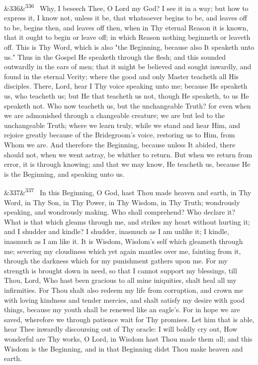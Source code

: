 \documentclass[12pt]{article}
\newcommand{\para}[1][]{\par\noindent\ifx&#1&\else\textsuperscript{\footnotesize #1}~\fi}
\begin{document}
\para[336] Why, I beseech Thee, O Lord my God? I see it in a way; but how to express it, I know not, unless it be, that whatsoever begins to be, and leaves off to be, begins then, and leaves off then, when in Thy eternal Reason it is known, that it ought to begin or leave off; in which Reason nothing beginneth or leaveth off. This is Thy Word, which is also "the Beginning, because also It speaketh unto us." Thus in the Gospel He speaketh through the flesh; and this sounded outwardly in the ears of men; that it might be believed and sought inwardly, and found in the eternal Verity; where the good and only Master teacheth all His disciples. There, Lord, hear I Thy voice speaking unto me; because He speaketh us, who teacheth us; but He that teacheth us not, though He speaketh, to us He speaketh not. Who now teacheth us, but the unchangeable Truth? for even when we are admonished through a changeable creature; we are but led to the unchangeable Truth; where we learn truly, while we stand and hear Him, and rejoice greatly because of the Bridegroom's voice, restoring us to Him, from Whom we are. And therefore the Beginning, because unless It abided, there should not, when we went astray, be whither to return. But when we return from error, it is through knowing; and that we may know, He teacheth us, because He is the Beginning, and speaking unto us.

\para[337] In this Beginning, O God, hast Thou made heaven and earth, in Thy Word, in Thy Son, in Thy Power, in Thy Wisdom, in Thy Truth; wondrously speaking, and wondrously making. Who shall comprehend? Who declare it? What is that which gleams through me, and strikes my heart without hurting it; and I shudder and kindle? I shudder, inasmuch as I am unlike it; I kindle, inasmuch as I am like it. It is Wisdom, Wisdom's self which gleameth through me; severing my cloudiness which yet again mantles over me, fainting from it, through the darkness which for my punishment gathers upon me. For my strength is brought down in need, so that I cannot support my blessings, till Thou, Lord, Who hast been gracious to all mine iniquities, shalt heal all my infirmities. For Thou shalt also redeem my life from corruption, and crown me with loving kindness and tender mercies, and shalt satisfy my desire with good things, because my youth shall be renewed like an eagle's. For in hope we are saved, wherefore we through patience wait for Thy promises. Let him that is able, hear Thee inwardly discoursing out of Thy oracle: I will boldly cry out, How wonderful are Thy works, O Lord, in Wisdom hast Thou made them all; and this Wisdom is the Beginning, and in that Beginning didst Thou make heaven and earth.
\end{document}
